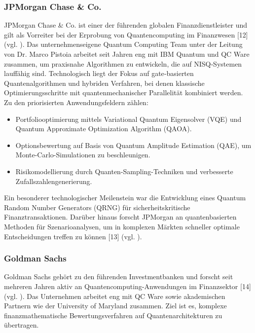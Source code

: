\subsubsection*{JPMorgan Chase \& Co.}
JPMorgan Chase \& Co. ist einer der führenden globalen Finanzdienstleister und gilt als Vorreiter bei der Erprobung von Quantencomputing im Finanzwesen [12] (vgl. \cite{brandhofer_benchmarking_20220}).
Das unternehmenseigene Quantum Computing Team unter der Leitung von Dr. Marco Pistoia arbeitet seit Jahren eng mit IBM Quantum und QC Ware zusammen, um praxisnahe Algorithmen zu entwickeln, die auf NISQ‑Systemen lauffähig sind.
Technologisch liegt der Fokus auf gate‑basierten Quantenalgorithmen und hybriden Verfahren, bei denen klassische Optimierungsschritte mit quantenmechanischer Parallelität kombiniert werden. Zu den priorisierten Anwendungsfeldern zählen:
\begin{itemize}
\item Portfoliooptimierung mittels Variational Quantum Eigensolver (VQE) und Quantum Approximate Optimization Algorithm (QAOA).
\item Optionsbewertung auf Basis von Quantum Amplitude Estimation (QAE), um Monte-Carlo-Simulationen zu beschleunigen.
\item Risikomodellierung durch Quanten-Sampling-Techniken und verbesserte Zufallszahlengenerierung.
\end{itemize}
Ein besonderer technologischer Meilenstein war die Entwicklung eines Quantum Random Number Generators (QRNG) für sicherheitskritische Finanztransaktionen. Darüber hinaus forscht JPMorgan an quantenbasierten Methoden für Szenarioanalysen, um in komplexen Märkten schneller optimale Entscheidungen treffen zu können [13] (vgl. \cite{brandhofer_benchmarking_20220}).

\subsubsection*{Goldman Sachs}
Goldman Sachs gehört zu den führenden Investmentbanken und forscht seit mehreren Jahren aktiv an Quantencomputing-Anwendungen im Finanzsektor [14] (vgl. \cite{brandhofer_benchmarking_20220}).
Das Unternehmen arbeitet eng mit QC Ware sowie akademischen Partnern wie der University of Maryland zusammen. Ziel ist es, komplexe finanzmathematische Bewertungsverfahren auf Quantenarchitekturen zu übertragen.


